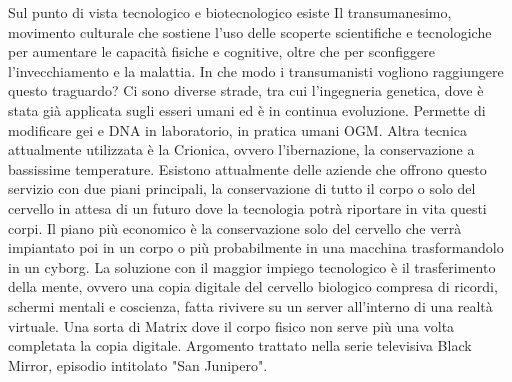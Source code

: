 \documentclass[12pt]{book} %
\begin{document}
Sul punto di vista tecnologico e biotecnologico esiste Il transumanesimo, movimento culturale che sostiene l'uso delle scoperte scientifiche e tecnologiche per aumentare le capacità fisiche e cognitive, oltre che per sconfiggere l'invecchiamento e la
malattia. In che modo i transumanisti vogliono raggiungere questo traguardo? Ci sono diverse strade, tra cui
l'ingegneria genetica, dove è stata già applicata sugli esseri umani ed è in continua evoluzione.
Permette di modificare gei e DNA in laboratorio, in pratica umani OGM. Altra tecnica attualmente utilizzata è la
Crionica, ovvero l'ibernazione, la conservazione a bassissime temperature. Esistono attualmente
delle aziende che offrono questo servizio con due piani principali, la conservazione di tutto il corpo o solo del
cervello in attesa di un futuro dove la tecnologia potrà riportare in vita questi corpi. Il piano più economico è la
conservazione solo del cervello che verrà impiantato poi in un corpo o più probabilmente in una macchina trasformandolo
in un cyborg. La soluzione con il maggior impiego tecnologico è il trasferimento della mente, ovvero una copia digitale
del cervello biologico compresa di ricordi, schermi mentali e coscienza, fatta rivivere su un server
all'interno di una realtà virtuale. Una sorta di Matrix dove il corpo fisico non serve più una
volta completata la copia digitale. Argomento trattato nella serie televisiva Black Mirror, episodio intitolato "San Junipero".
\end{document}
